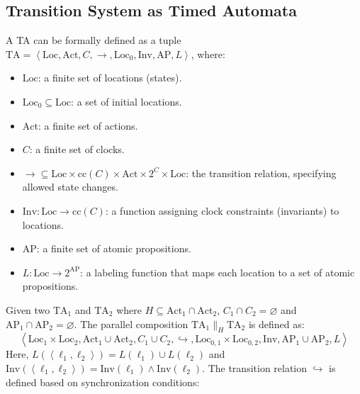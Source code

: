 \subsection{Transition System as Timed Automata}
\begin{definition}
    A TA can be formally defined as a tuple $\text{TA} = \left\langle \text{Loc}, \text{Act}, C, \rightarrow, \text{Loc}_0, \text{Inv}, \text{AP},L\right\rangle$, where:
    \begin{itemize}
        \item $\text{Loc}$: a finite set of locations (states).
        \item $\text{Loc}_0\subseteq\text{Loc}$: a set of initial locations.
        \item $\text{Act}$: a finite set of actions.
        \item $C$: a finite set of clocks.
        \item $\rightarrow\subseteq\text{Loc}\times\text{cc}(C)\times\text{Act}\times 2^C\times\text{Loc}$: the transition relation, specifying allowed state changes.
        \item $\text{Inv}:\text{Loc}\rightarrow\text{cc}(C)$: a function assigning clock constraints (invariants) to locations.
        \item $\text{AP}$: a finite set of atomic propositions.
        \item $L:\text{Loc}\rightarrow 2^{\text{AP}}$: a labeling function that maps each location to a set of atomic propositions.
    \end{itemize}
\end{definition}
Given two $\text{TA}_1$ and $\text{TA}_2$ where $H\subseteq\text{Act}_1\cap\text{Act}_2$, $C_1\cap C_2=\varnothing$ and $\text{AP}_1\cap\text{AP}_2=\varnothing$. 
The parallel composition $\text{TA}_1\parallel_H\text{TA}_2$ is defined as:
\[\left\langle \text{Loc}_1\times\text{Loc}_2, \text{Act}_1\cup\text{Act}_2, C_1\cup C_2, \hookrightarrow, \text{Loc}_{0,1}\times\text{Loc}_{0,2}, \text{Inv}, \text{AP}_1\cup\text{AP}_2,L\right\rangle\]
Here, $L(\left\langle \ell_1,\ell_2\right\rangle )=L(\ell_1)\cup L(\ell_2)$ and $\text{Inv}(\left\langle \ell_1,\ell_2\right\rangle )=\text{Inv}(\ell_1)\land \text{Inv}(\ell_2)$. 
The transition relation $\hookrightarrow$ is defined based on synchronization conditions:
